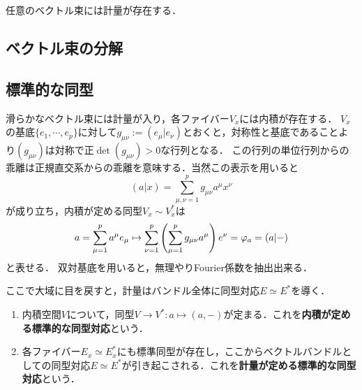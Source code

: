 \documentclass[uplatex,dvipdfmx]{jsreport}
\begin{document}
\begin{theorem}
    任意のベクトル束には計量が存在する．
\end{theorem}

\subsection{ベクトル束の分解}

\subsection{標準的な同型}

\begin{tcolorbox}[colframe=ForestGreen, colback=ForestGreen!10!white,breakable,colbacktitle=ForestGreen!40!white,coltitle=black,fonttitle=\bfseries\sffamily,
title=]
    滑らかなベクトル束には計量が入り，各ファイバー$V_x$には内積が存在する．
    $V_x$の基底$\{e_1,\cdots,e_p\}$に対して$g_{\mu\nu}:=(e_\mu|e_\nu)$とおくと，対称性と基底であることより$(g_{\mu\nu})$は対称で正$\det(g_{\mu\nu})>0$な行列となる．
    この行列の単位行列からの乖離は正規直交系からの乖離を意味する．当然この表示を用いると
    \[(a|x)=\sum_{\mu,\nu=1}^pg_{\mu\nu}a^\mu x^\nu\]
    が成り立ち，内積が定める同型$V_x\sim V_x^*$は
    \[a=\sum^p_{\mu=1}a^\mu e_\mu\mapsto\sum^p_{\nu=1}\left(\sum^p_{\mu=1}g_{\mu\nu}a^\mu\right)e^\nu=\varphi_a=(a|-)\]
    と表せる．
    双対基底を用いると，無理やりFourier係数を抽出出来る．
    
    ここで大域に目を戻すと，計量はバンドル全体に同型対応$E\simeq E^*$を導く．
\end{tcolorbox}

\begin{definition}\mbox{}
    \begin{enumerate}
        \item 内積空間$V$について，同型$V\to V^*:a\mapsto(a,-)$が定まる．これを\textbf{内積が定める標準的な同型対応}という．
        \item 各ファイバー$E_x\simeq E_x^*$にも標準同型が存在し，ここからベクトルバンドルとしての同型対応$E\simeq E^*$が引き起こされる．これを\textbf{計量が定める標準的な同型対応}という．
    \end{enumerate}
\end{definition}
\end{document}
